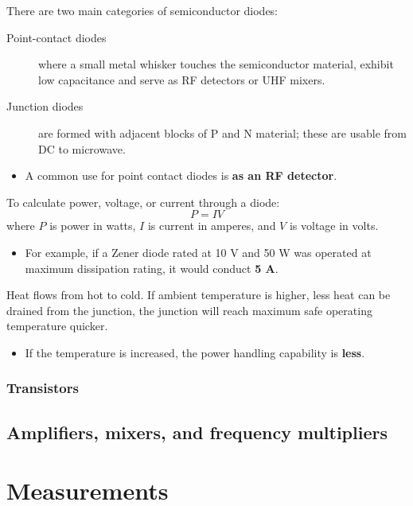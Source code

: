 \documentclass[letterpaper]{article}
\begin{document}
        There are two main categories of semiconductor diodes:
        \begin{description}
            \item[Point-contact diodes] where a small metal whisker touches the semiconductor material, exhibit low capacitance and serve as RF detectors or UHF mixers.
            \item[Junction diodes] are formed with adjacent blocks of P and N material; these are usable from DC to microwave.
        \end{description}
        \begin{itemize}
            \item A common use for point contact diodes is \textbf{as an RF detector}.
        \end{itemize}

        To calculate power, voltage, or current through a diode:
        $$ P = I V $$
        where $ P $ is power in watts, $ I $ is current in amperes, and $ V $ is voltage in volts.
        \begin{itemize}
            \item For example, if a Zener diode rated at 10 V and 50 W was operated at maximum dissipation rating, it would conduct \textbf{5 A}.
        \end{itemize}

        Heat flows from hot to cold.
        If ambient temperature is higher, less heat can be drained from the junction, the junction will reach maximum safe operating temperature quicker.
        \begin{itemize}
            \item If the temperature is increased, the power handling capability is \textbf{less}.
        \end{itemize}

        \subsubsection{Transistors}

        \newpage

        \subsection{Amplifiers, mixers, and frequency multipliers}

        \newpage

        \section{Measurements}
\end{document}
